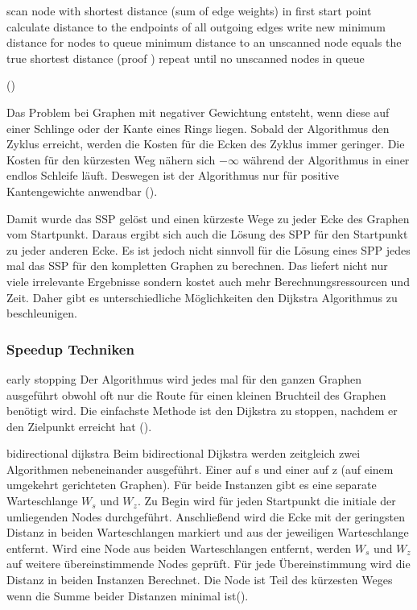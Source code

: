 \documentclass[10pt,a4paper]{article}
\begin{document}
scan node with shortest distance (sum of edge weights) in first start point
calculate distance to the endpoints of all outgoing edges 
write new minimum distance for nodes to queue
minimum distance to an unscanned node equals the true shortest distance (proof \cite[197f]{kurt})
repeat until no unscanned nodes in queue

(\cite{dijkstra})

Das Problem bei Graphen mit negativer Gewichtung entsteht, wenn diese auf einer Schlinge oder der Kante eines Rings liegen. Sobald der Algorithmus den Zyklus erreicht, werden die Kosten für die Ecken des Zyklus immer geringer. Die Kosten für den kürzesten Weg nähern sich $-\infty $ während der Algorithmus in einer endlos Schleife läuft. Deswegen ist der Algorithmus nur für positive Kantengewichte anwendbar (\cite[194f]{kurt}).

Damit wurde das SSP gelöst und einen kürzeste Wege zu jeder Ecke des Graphen vom Startpunkt. Daraus ergibt sich auch die Lösung des SPP für den Startpunkt zu jeder anderen Ecke. Es ist jedoch nicht sinnvoll für die Lösung eines SPP jedes mal das SSP für den kompletten Graphen zu berechnen. Das liefert nicht nur viele irrelevante Ergebnisse sondern kostet auch mehr Berechnungsressourcen und Zeit. Daher gibt es unterschiedliche Möglichkeiten den Dijkstra Algorithmus zu beschleunigen.

\subsubsection{Speedup Techniken}

early stopping 
Der Algorithmus wird jedes mal für den ganzen Graphen ausgeführt obwohl oft nur die Route für einen kleinen Bruchteil des Graphen benötigt wird. Die einfachste Methode ist den Dijkstra zu stoppen, nachdem er den Zielpunkt erreicht hat (\cite[209]{kurt}). 


bidirectional dijkstra
Beim bidirectional Dijkstra werden zeitgleich zwei Algorithmen nebeneinander ausgeführt. Einer auf s und einer auf z (auf einem umgekehrt gerichteten Graphen). Für beide Instanzen gibt es eine separate Warteschlange $W_{s}$ und $W_{z}$. Zu Begin wird für jeden Startpunkt die initiale der umliegenden Nodes durchgeführt. Anschließend wird die Ecke mit der geringsten Distanz in beiden Warteschlangen markiert und aus der jeweiligen Warteschlange entfernt. Wird eine Node aus beiden Warteschlangen entfernt, werden $W_{s}$ und $W_{z}$ auf weitere übereinstimmende Nodes geprüft. Für jede Übereinstimmung wird die Distanz in beiden Instanzen Berechnet. Die Node ist Teil des kürzesten Weges wenn die Summe beider Distanzen minimal ist(\cite[209f]{kurt}).
\end{document}
